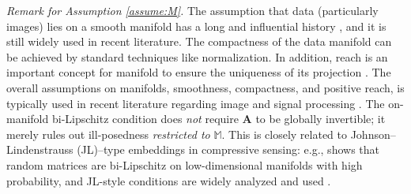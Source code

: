 \documentclass{amsart} %
\def\mA{{\bm{A}}}
\def\sM{{\mathbb{M}}}
\theoremstyle{definition}
\theoremstyle{remark}
\begin{document}
\textit{Remark for Assumption \ref{assume:M}.} The assumption that data (particularly images) lies on a smooth manifold has a long and influential history \cite{roweis2000nonlinear,donoho2005image}, and it is still widely used in recent literature. The compactness of the data manifold can be achieved by standard techniques like normalization. In addition, reach is an important concept for manifold to ensure the uniqueness of its projection \cite{federer1959curvature,aamari2019estimating}. The overall assumptions on manifolds, smoothness, compactness, and positive reach, is typically used in recent literature regarding image and signal processing \cite{tang2024adaptivity,potaptchik2024linear,azangulov2024convergence}.
The on-manifold bi-Lipschitz condition does \emph{not} require $\mA$ to be globally invertible; it merely rules out ill-posedness \emph{restricted to} $\sM$.
This is closely related to Johnson–Lindenstrauss (JL)–type embeddings in compressive sensing: e.g., \cite{baraniuk2009random} shows that random matrices are bi-Lipschitz on low-dimensional manifolds with high probability, and JL-style conditions are widely analyzed and used \cite{candes2006near,clarkson2008tighter,wakin2010manifold,iwen2013approximation,hegde2012signal}.
\end{document}
